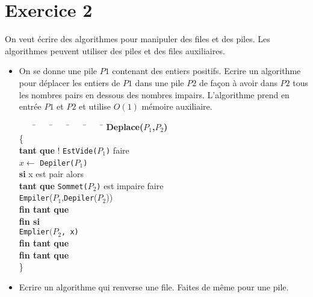 \documentclass[10pt,a4paper]{article}
\begin{document}
\section*{Exercice 2}
On veut écrire des algorithmes pour manipuler des files et des piles. Les algorithmes peuvent utiliser des piles et des files auxiliaires.  
\begin{itemize}
\item On se donne une pile $P1$ contenant des entiers positifs. Ecrire un algorithme pour déplacer les entiers de $P1$ dans une pile $P2$ de façon à avoir dans $P2$ tous les nombres pairs en dessous des nombres impairs. L'algorithme prend en entrée $P1$ et $P2$ et utilise $O(1)$ mémoire auxiliaire.

\begin{tcolorbox}
\begin{tabbing}
	~~~~\=~~~~\=~~~~\=~~~~\=~~~~\=\kill
	\>  \textbf{Deplace($P_1$,$P_2$)}\\
	 \> \{\\   \textbf{tant que} ! \texttt{EstVide($P_1$)} faire\\
               \>         $x  \leftarrow$ \texttt{Depiler($P_1$)}\\
        \>  \textbf{si} x est pair alors\\
             \textbf{tant que} \texttt{Sommet($P_2$)} est impaire faire\\
                \texttt{Empiler}($P_1$,\texttt{Depiler}($P_2$))\\
           \textbf{fin tant que}\\
        \textbf{fin si}\\
        \texttt{Emplier$(P_2$, x)}\\
   \textbf{fin tant que}\\

              \> \> \> \textbf{fin tant que}\\
        \> \} 
\end{tabbing}
\end{tcolorbox}



\item Ecrire un algorithme qui renverse une file. Faites de m\^eme pour une pile.


\end{itemize}
\end{document}
